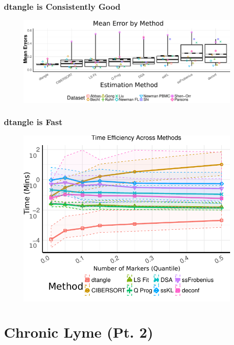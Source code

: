 \documentclass[usenames,dvipsnames,15pt]{beamer}
\begin{document}
\begin{frame}
  \frametitle{dtangle is Consistently Good}
  \begin{figure}
  \hspace*{-1cm}
  \includegraphics[scale=.499]{pictures/meta_boxplots.pdf}
  \end{figure}
\end{frame}

\begin{frame}
  \frametitle{dtangle is Fast}
  \begin{figure}
  \hspace*{-1cm}
  \includegraphics[scale=.8]{pictures/time_plot.pdf}
  \end{figure}
\end{frame}

\section{Chronic Lyme (Pt. 2)}
\end{document}
